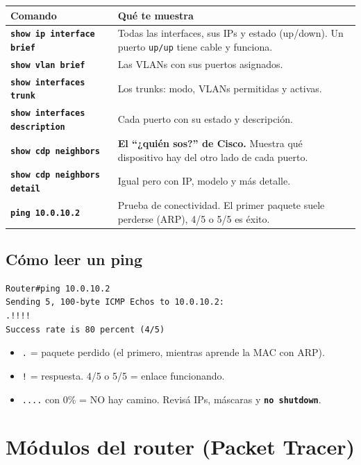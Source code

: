 \documentclass[11pt,a4paper]{report}
\newcommand{\cmd}[1]{\texttt{\textbf{#1}}}
\begin{document}
\begin{longtable}{@{}p{7cm}p{8.5cm}@{}}
\toprule
\textbf{Comando} & \textbf{Qué te muestra} \\
\midrule
\endhead
\cmd{show ip interface brief} & Todas las interfaces, sus IPs y estado (up/down). Un puerto \texttt{up/up} tiene cable y funciona. \\
\addlinespace
\cmd{show vlan brief} & Las VLANs con sus puertos asignados. \\
\addlinespace
\cmd{show interfaces trunk} & Los trunks: modo, VLANs permitidas y activas. \\
\addlinespace
\cmd{show interfaces description} & Cada puerto con su estado y descripción. \\
\addlinespace
\cmd{show cdp neighbors} & \textbf{El ``¿quién sos?'' de Cisco.} Muestra qué dispositivo hay del otro lado de cada puerto. \\
\addlinespace
\cmd{show cdp neighbors detail} & Igual pero con IP, modelo y más detalle. \\
\addlinespace
\cmd{ping 10.0.10.2} & Prueba de conectividad. El primer paquete suele perderse (ARP), 4/5 o 5/5 es éxito. \\
\bottomrule
\end{longtable}

\section{Cómo leer un ping}

\begin{lstlisting}
Router#ping 10.0.10.2
Sending 5, 100-byte ICMP Echos to 10.0.10.2:
.!!!!
Success rate is 80 percent (4/5)
\end{lstlisting}

\begin{itemize}
  \item \texttt{.} = paquete perdido (el primero, mientras aprende la MAC con ARP).
  \item \texttt{!} = respuesta. 4/5 o 5/5 = enlace funcionando.
  \item \texttt{....} con 0\% = NO hay camino. Revisá IPs, máscaras y \cmd{no shutdown}.
\end{itemize}

\chapter{Módulos del router (Packet Tracer)}
\end{document}
